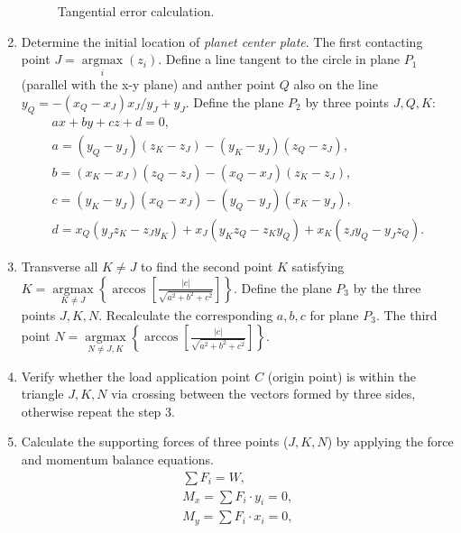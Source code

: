 \documentclass[a4paper,fleqn]{cas-sc}%
\begin{document}
\begin{enumerate}
\begin{figure}[pos=htbp]
        \caption{Tangential error calculation.}
        \label{fig:tangential_error}
    \end{figure}
    \item Determine the initial location of \textit{planet center plate}. The first contacting point $J=\mathop{\arg\max}\limits_{i}(z_i)$. Define a line  tangent to the circle in plane  $P_1$ (parallel with the x-y plane) and anther point $Q$ also on the line $y_Q=-(x_Q-x_J)x_J/y_J+y_J$. Define the plane $P_2$ by three points $J, Q, K$:
    \begin{equation}
        \begin{split}
        a x+ b y+ c z+ d=0,\\
        a= \left(y_Q-y_J\right)\left(z_K-z_J\right)-\left(y_K-y_J\right) \left(z_Q-z_J\right),\\
        b=\left(x_K-x_J\right) \left(z_Q-z_J\right)-\left(x_Q-x_J\right) \left(z_K-z_J\right),\\
        c=\left(y_K-y_J\right) \left(x_Q-x_J\right)-\left(y_Q-y_J\right) \left(x_K-y_J\right),\\
        d=x_Q \left(y_J z_K-z_J y_K\right)+x_J \left(y_K z_Q-z_K y_Q\right)+x_K \left(z_J y_Q-y_J z_Q\right).
        \end{split} 
    \end{equation}
    \item Transverse all $K\neq J$ to find the second point $K$ satisfying $K=\mathop{\arg\max}\limits_{K \neq J}\left\{\arccos\left[\frac{|c|}{\sqrt{a^2+b^2+c^2}}\right]\right\}$. Define the plane  $P_3$  by the three points $J, K, N$. Recalculate the corresponding $a, b,c$ for plane $P_3$. The third point $N=\mathop{\arg\max}\limits_{N \neq J,K}\left\{\arccos\left[\frac{|c|}{\sqrt{a^2+b^2+c^2}}\right]\right\}$.
    \item Verify whether the load  application point $C$ (origin point) is within the triangle $J,K,N$ via crossing between the vectors formed by three sides, otherwise repeat the step 3.
    \item Calculate the supporting forces of three points ($J,K,N$) by applying the force and momentum balance equations.
    \begin{equation}
        \begin{split}
        \sum F_i=W,\\
        M_x=\sum F_i\cdot y_i=0,\\
        M_y=\sum F_i\cdot x_i=0, \label{eq:force_equilibrium}
        \end{split}
    \end{equation}

\end{enumerate}
\end{document}
